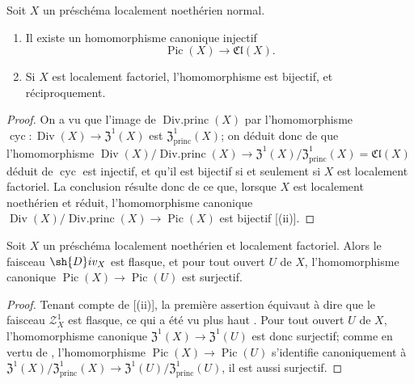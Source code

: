 \begin{corollary}[21.6.10]
\label{IV.21.6.10}
Soit $X$ un préschéma localement noethérien \textup{normal}.
\begin{enumerate}[label=\textup{(\roman*)}]
  \item Il existe un homomorphisme canonique injectif
\[
\label{IV.21.6.10.1}
  \operatorname{Pic}(X)\to\mathfrak{Cl}(X).
  \tag{21.6.10.1}
\]

  \item Si $X$ est localement factoriel, l'homomorphisme  est bijectif, et réciproquement.
\end{enumerate}
\end{corollary}

\begin{proof}
On a vu  que l'image de $\operatorname{Div.princ}(X)$ par l'homomorphisme $\operatorname{cyc}:\operatorname{Div}(X)\to\mathfrak{Z}^1(X)$ est $\mathfrak{Z}^1_\mathrm{princ}(X)$;
on déduit donc de  que l'homomorphisme $\operatorname{Div}(X)/\operatorname{Div.princ}(X)\to\mathfrak{Z}^1(X)/\mathfrak{Z}^1_\mathrm{princ}(X)=\mathfrak{Cl}(X)$ déduit de $\operatorname{cyc}$ est injectif, et qu'il est bijectif si et seulement si $X$ est localement factoriel.
La conclusion résulte donc de ce que, lorsque $X$ est localement noethérien et réduit, l'homomorphisme canonique $\operatorname{Div}(X)/\operatorname{Div.princ}(X)\to\operatorname{Pic}(X)$  est bijectif [(ii)].
\end{proof}

\begin{corollary}[21.6.11]
\label{IV.21.6.11}
Soit $X$ un préschéma localement noethérien et localement factoriel.
Alors le faisceau $\sh{D}iv_X$ est flasque, et pour tout ouvert $U$ de $X$, l'homomorphisme canonique $\operatorname{Pic}(X)\to\operatorname{Pic}(U)$ est surjectif.
\end{corollary}

\begin{proof}
Tenant compte de [(ii)], la première assertion équivaut à dire que le faisceau $\mathscr{Z}_X^1$ est flasque, ce qui a été vu plus haut .
Pour tout ouvert $U$ de $X$, l'homomorphisme canonique $\mathfrak{Z}^1(X)\to\mathfrak{Z}^1(U)$ est donc surjectif;
comme en vertu de , l'homomorphisme $\operatorname{Pic}(X)\to\operatorname{Pic}(U)$ s'identifie canoniquement à $\mathfrak{Z}^1(X)/\mathfrak{Z}^1_\mathrm{princ}(X)\to\mathfrak{Z}^1(U)/\mathfrak{Z}^1_\mathrm{princ}(U)$, il est aussi surjectif.
\end{proof}

